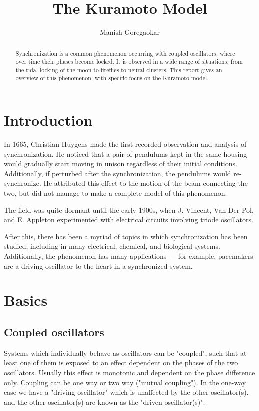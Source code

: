 \documentclass[12pt]{article}
\begin{document}
\title{The Kuramoto Model}
\author{Manish Goregaokar}

\maketitle

\begin{abstract}
Synchronization is a common phenomenon occurring with coupled oscillators, where over time their phases become locked. It is observed in a wide range of situations, from the tidal locking of the moon to fireflies to neural clusters. This report gives an overview of this phenomenon, with specific focus on the Kuramoto model.
\end{abstract}
\tableofcontents
\section{Introduction}

In 1665, Christian Huygens made the first recorded observation and analysis of synchronization\cite{bennett2002huygens}. He noticed that a pair of pendulums kept in the same housing would gradually start moving in unison regardless of their initial conditions. Additionally, if perturbed after the synchronization, the pendulums would re-synchronize. He attributed this effect to the motion of the beam connecting the two, but did not manage to make a complete model of this phenomenon.

The field was quite dormant until the early 1900s, when J. Vincent\cite{vincent1919some}, Van Der Pol\cite{van1920theory}, and E. Appleton\cite{appleton1922automatic} experimented with electrical circuits involving triode oscillators.

After this, there has been a myriad of topics in which synchronization has been studied, including in many electrical, chemical, and biological systems. Additionally, the phenomenon has many applications --- for example, pacemakers are a driving oscillator to the heart in a synchronized system.

\section{Basics}
\subsection{Coupled oscillators}
Systems which individually behave as oscillators can be "coupled", such that at least one of them is exposed to an effect dependent on the phases of the two oscillators. Usually this effect is monotonic and dependent on the phase difference only. Coupling can be one way or two way ("mutual coupling"). In the one-way case we have a "driving oscillator" which is unaffected by the other oscillator(s), and the other oscillator(s) are known as the "driven oscillator(s)".
\end{document}
